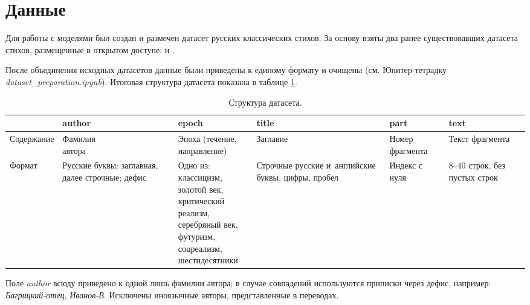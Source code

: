 \documentclass[a4paper,12pt]{article}
\begin{document}
\section{Данные}

Для работы с моделями был создан и размечен датасет русских классических стихов. За основу взяты два ранее существовавших датасета стихов, размещенные в открытом доступе: \cite{russian_poetry_corpus} и \cite{russian_poems_19000}.

После объединения исходных датасетов данные были приведены к единому формату и очищены (см. Юпитер-тетрадку \textit{dataset\_preparation.ipynb}). Итоговая структура датасета показана в таблице \ref{tab:dataset}.

\begin{table}[t]
\centering
\begin{tabular}[t]{|m{1.4cm}|m{2.8cm}|m{4.2cm}|m{2.9cm}|m{1.3cm}|m{1.4cm}|}
    \hline
    & \textbf{author} & \textbf{epoch} & \textbf{title} & \textbf{part} & \textbf{text} \\
    \hline
    \hline
    Содер\-жание & \makecell[l]{Фамилия \\ автора} \par & \makecell[l]{Эпоха (течение, \\ направление)} \par & Заглавие & Номер фрагмента & Текст фрагмента \\
    \hline
    Формат & Русские буквы: заглавная, далее строчные; дефис & \makecell[l]{Одно из: \\ классицизм, \\ золотой век, \\ критический реализм, \\ серебряный век, \\ футуризм, \\ соцреализм, \\ шестидесятники} \par & Строчные русские и~английские буквы, цифры, пробел & Индекс с нуля & $8$--$40$ строк, без пустых строк \\
    \hline
\end{tabular}
\caption{Структура датасета.}
\label{tab:dataset}
\end{table}

Поле \textit{author} всюду приведено к одной лишь фамилии автора; в случае совпадений используются приписки через дефис, например: \textit{Багрицкий-отец}, \textit{Иванов-В}. Исключены иноязычные авторы, представленные в переводах.
\end{document}
